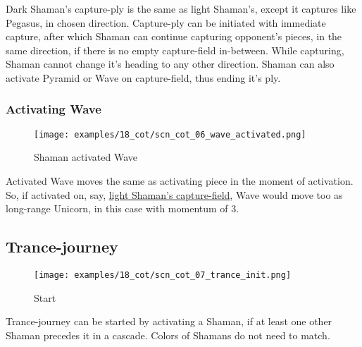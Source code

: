 Dark Shaman's capture-ply is the same as light Shaman's, except it captures like
Pegasus, in chosen direction. Capture-ply can be initiated with immediate capture,
after which Shaman can continue capturing opponent's pieces, in the same direction,
if there is no empty capture-field in-between. While capturing, Shaman cannot change
it's heading to any other direction. Shaman can also activate Pyramid or Wave on
capture-field, thus ending it's ply.

\clearpage %

\subsubsection*{Activating Wave}

\noindent
\begin{figure}[!h]
\texttt{[image: examples/18\_cot/scn\_cot\_06\_wave\_activated.png]}
\caption{Shaman activated Wave}
\label{fig:scn_cot_06_wave_activated}
\end{figure}

Activated Wave moves the same as activating piece in the moment of activation.
So, if activated on, say,
\hyperref[fig:scn_cot_03_light_shaman_capture_ply]{light Shaman's capture-field},
Wave would move too as long-range Unicorn, in this case with momentum of 3.

\clearpage %

\subsection*{Trance-journey}

\noindent
\begin{wrapfigure}[9]{l}{0.35\textwidth} %
\centering
\texttt{[image: examples/18\_cot/scn\_cot\_07\_trance\_init.png]}
\caption{Start}
\label{fig:scn_cot_07_trance_init}
\end{wrapfigure}
Trance-journey can be started by activating a Shaman, if at least one other Shaman
precedes it in a cascade. Colors of Shamans do not need to match.

